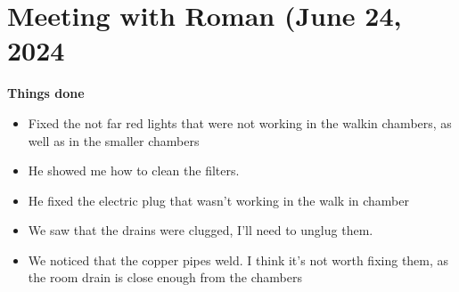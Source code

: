 \documentclass[11pt]{article}
\begin{document}
\section{Meeting with Roman (June 24, 2024}
\textbf {Things done}
\begin {itemize}
	\item Fixed the not far red lights that were not working in the walkin chambers, as well as in the smaller chambers
	\item He showed me how to clean the filters. 
	\item He fixed the electric plug that wasn't working in the walk in chamber
	\item We saw that the drains were clugged, I'll need to unglug them.
	\item We noticed that the copper pipes weld. I think it's not worth fixing them, as the room drain is close enough from the chambers
\end {itemize}
\end{document}
